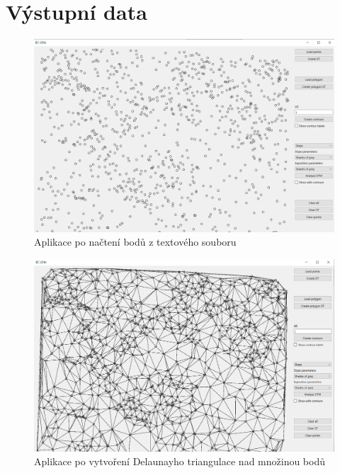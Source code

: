 \documentclass[11pt]{article}
\begin{document}
\section{Výstupní data}
\begin{figure}[htbh]
	\centering
	\captionsetup{justification=centering}
	\includegraphics[scale=0.35]{images/vystup_LoadPoints.png} 
	\caption{Aplikace po načtení bodů z textového souboru}
	\label{fig:vystup_LoadPoints}
\end{figure} 
\begin{figure}[htbh]
	\centering
	\captionsetup{justification=centering}
	\includegraphics[scale=0.35]{images/vystup_CreateDT.png} 
	\caption{Aplikace po vytvoření Delaunayho triangulace nad množinou bodů}
	\label{fig:vystup_CreateDT}
\end{figure} 
\end{document}
